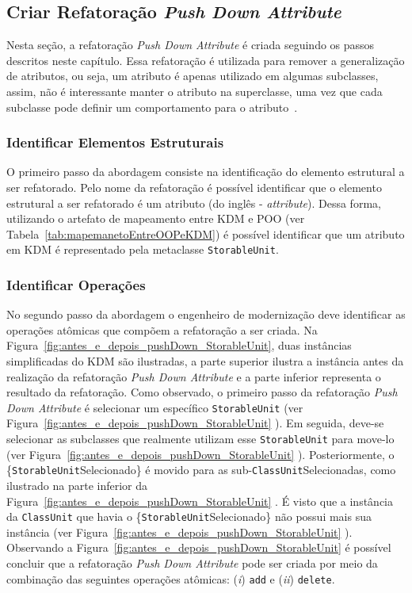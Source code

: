 
		
\subsection{Criar Refatoração \textit{Push Down Attribute}}
Nesta seção, a refatoração \textit{Push Down Attribute} é criada seguindo os passos descritos neste capítulo. Essa refatoração é utilizada para remover a generalização de atributos, ou seja, um atributo é apenas utilizado em algumas subclasses, assim, não é interessante manter o atributo na superclasse, uma vez que cada subclasse pode definir um comportamento para o atributo~\cite{Fowler1999}.


\subsubsection{Identificar Elementos Estruturais}
O primeiro passo da abordagem consiste na identificação do elemento estrutural a ser refatorado. Pelo nome da refatoração é possível identificar que o elemento estrutural a ser refatorado é um atributo (do inglês - \textit{attribute}). Dessa forma, utilizando o artefato de mapeamento entre KDM e POO (ver Tabela~\ref{tab:mapemanetoEntreOOPeKDM}) é possível identificar que um atributo em KDM é representado pela metaclasse \texttt{StorableUnit}.

\subsubsection{Identificar Operações}
No segundo passo da abordagem o engenheiro de modernização deve identificar as operações atômicas que compõem a refatoração a ser criada. Na Figura~\ref{fig:antes_e_depois_pushDown_StorableUnit}, duas instâncias simplificadas do KDM são ilustradas, a parte superior ilustra a instância antes da realização da refatoração \textit{Push Down Attribute} e a parte inferior representa o resultado da refatoração. Como observado, o primeiro passo da refatoração \textit{Push Down Attribute} é selecionar um específico \texttt{StorableUnit} (ver Figura~\ref{fig:antes_e_depois_pushDown_StorableUnit} ). Em seguida, deve-se selecionar as subclasses que realmente utilizam esse \texttt{StorableUnit} para move-lo (ver Figura~\ref{fig:antes_e_depois_pushDown_StorableUnit} ). Posteriormente, o \{\texttt{StorableUnit}Selecionado\} é movido para as sub-\texttt{ClassUnit}Selecionadas, como ilustrado na parte inferior da Figura~\ref{fig:antes_e_depois_pushDown_StorableUnit} . É visto que a instância da \texttt{ClassUnit} que havia o \{\texttt{StorableUnit}Selecionado\} não possui mais sua instância (ver Figura~\ref{fig:antes_e_depois_pushDown_StorableUnit} ). Observando a Figura~\ref{fig:antes_e_depois_pushDown_StorableUnit} é possível concluir que a refatoração \textit{Push Down Attribute} pode ser criada por meio da combinação das seguintes operações atômicas: (\textit{i}) \texttt{add} e (\textit{ii}) \texttt{delete}. 

